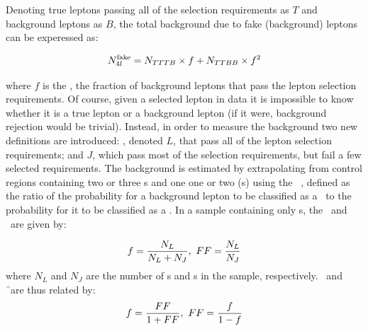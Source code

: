 Denoting true leptons passing all of the selection requirements as $T$ and background leptons as $B$, the total background due
to fake (background) leptons can be experessed as:

\begin{equation}
N_{4l}^{\rm fake} = N_{TTTB} \times f + N_{TTBB} \times f^{2}
\label{eqn:bg-4l-true}
\end{equation}

where $f$ is the \frate, the fraction of background leptons that pass the lepton selection
requirements. Of course, given a selected lepton in data it is impossible to
know whether it is a true lepton or a background lepton (if it were, background
rejection would be trivial). Instead, in order to measure the background 
two new definitions are introduced: , denoted $L$, that
pass all of the lepton selection requirements; and  $J$, which
pass most of the selection requirements, but fail a few selected requirements.
The background is estimated by extrapolating from control regions containing
two or three \sellep s and one one or two \lljet (s) using the
\intro{\ffactor}\ \FF, defined as the ratio of the probability for a background lepton to be
classified as a \sellep\ to the probability for it to be classified as a \lljet.
In a sample containing only \bglep s, the \frate\ and \ffactor\ are given by: 

\begin{equation}
f = \frac{N_{L}}{N_{L} + N_{J}},\ FF = \frac{N_{L}}{N_{J}}
\end{equation}
where $N_{L}$ and $N_{J}$ are the number of \sellep s and \lljet s in the sample,
respectively. \FF\ and \f\ are thus related by:
\begin{equation}
f = \frac{FF}{1 + FF},\ FF = \frac{f}{1-f}
\label{eqn:bg-f-FF-relations}
\end{equation}


